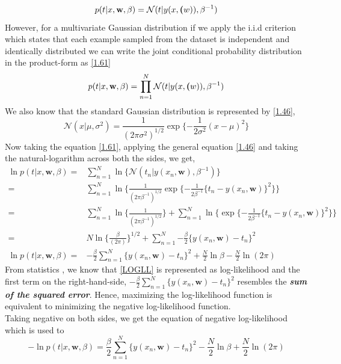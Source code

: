 \documentclass[12pt,twoside,a4paper]{article}
\begin{document}
\begin{equation}\label{1.60}
    p(t|x,\textbf{w}, \beta) = \mathcal{N}(t|y(x,\textbf(w)),\beta^{-1})
\end{equation}
However, for a multivariate Gaussian distribution if we apply the i.i.d criterion which states that each example sampled from the dataset is independent and identically distributed we can write the joint conditional probability distribution in the product-form as \eqref{1.61}
\begin{equation}\label{1.61}
    p(t|x,\textbf{w}, \beta) = \prod_{n=1}^{N}\mathcal{N}(t|y(x,\textbf(w)),\beta^{-1})
\end{equation}
We also know that the standard Gaussian distribution is represented by \eqref{1.46},
\begin{equation} \label{1.46}
    \mathcal{N}(x|\mu,\sigma^2) = \frac{1}{(2\pi\sigma^2)^{1/2}}\exp\{-\frac{1}{2\sigma^2}(x-\mu)^2\}
\end{equation}
Now taking the equation \eqref{1.61}, applying the general equation \eqref{1.46} and taking the natural-logarithm across both the sides, we get,
\begin{align} \label{1.62}
\ln p(t|x,\textbf{w}, \beta) =& \sum_{n=1}^{N} \ln \{ \mathcal{N}(t_n|y(x_n,\textbf{w}),\beta^{-1}) \} \\
=& \sum_{n=1}^{N} \ln \{ \frac{1}{(2\pi\beta^{-1})^{1/2}}\exp\{-\frac{1}{2\beta^{-1}}\{t_n-y(x_n,\textbf{w})\}^2\}\} \\
=&\sum_{n=1}^{N} \ln \{ \frac{1}{(2\pi\beta^{-1})^{1/2}} \} + \sum_{n=1}^{N} \ln \{\exp\{-\frac{1}{2\beta^{-1}}\{t_n-y(x_n,\textbf{w})\}^2\}\} \\
=& N\ln \{ \frac{\beta}{(2\pi)} \}^{1/2} + \sum_{n=1}^{N} {-\frac{\beta}{2}\{y(x_n,\textbf{w})-t_n\}^2} \\
\ln p(t|x,\textbf{w}, \beta) =& -\frac{\beta}{2}\sum_{n=1}^{N} {\{y(x_n,\textbf{w})-t_n\}^2} + \frac{N}{2}\ln\beta - \frac{N}{2}\ln(2\pi) \label{LOGLL}
\end{align}
From statistics \cite{statistical}, we know that \eqref{LOGLL} is represented as log-likelihood and the first term on the right-hand-side, $-\frac{\beta}{2}\sum_{n=1}^{N} {\{y(x_n,\textbf{w})-t_n\}^2}$ resembles the \textit{\textbf{sum of the squared error}}. Hence, maximizing the log-likelihood function is equivalent to minimizing the negative log-likelihood function. \\
Taking negative on both sides, we get the equation of negative log-likelihood which is used to 
\begin{equation} \label{NLL}
    -\ln p(t|x,\textbf{w}, \beta) = \frac{\beta}{2}\sum_{n=1}^{N} {\{y(x_n,\textbf{w})-t_n\}^2} - \frac{N}{2}\ln\beta + \frac{N}{2}\ln(2\pi)
\end{equation}
\end{document}
